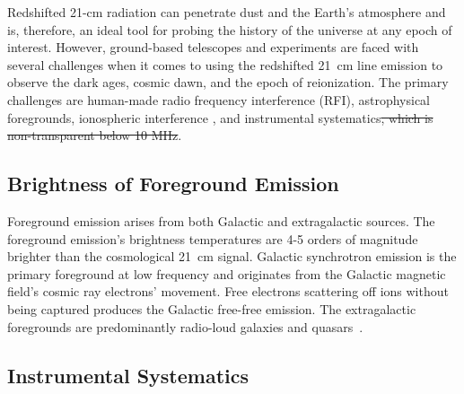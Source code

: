 Redshifted 21-cm radiation can penetrate dust and the Earth's atmosphere and is, therefore, an ideal tool for probing the history of the universe at any epoch of interest. However, ground-based telescopes and experiments are faced with several challenges when it comes to using the redshifted \SI{21}{cm} line emission to observe the dark ages, cosmic dawn, and the epoch of reionization. The primary challenges are human-made radio frequency interference (RFI), astrophysical foregrounds, ionospheric interference , and instrumental systematics\st{, which is non-transparent below 10 MHz}. 

\subsection*{Brightness of Foreground Emission}

Foreground emission arises from both  Galactic  and extragalactic sources. The foreground emission's brightness temperatures are 4-5 orders of magnitude brighter than the cosmological \SI{21}{cm} signal. Galactic synchrotron emission is the primary foreground at low frequency and originates from the Galactic magnetic field's cosmic ray electrons' movement. Free electrons scattering off ions without being captured produces the Galactic free-free emission. The extragalactic foregrounds are predominantly radio-loud galaxies and quasars~\citep{2018RAA....18..114H, 2008MNRAS.389.1319J}.

\subsection*{Instrumental Systematics}\label{s:chall}

